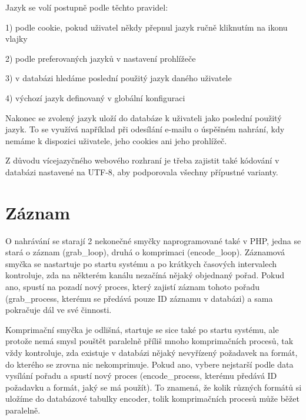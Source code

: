 \vspace{10pt}

Jazyk se volí postupně podle těchto pravidel: 

\vspace{10pt}

1) podle cookie, pokud uživatel někdy přepnul jazyk ručně kliknutím na ikonu vlajky

2) podle preferovaných jazyků v nastavení prohlížeče

3) v databázi hledáme poslední použitý jazyk daného uživatele

4) výchozí jazyk definovaný v globální konfiguraci

\vspace{10pt}

Nakonec se zvolený jazyk uloží do databáze k uživateli jako poslední použitý jazyk. To se využívá například při odesílání e-mailu o úspěšném nahrání, kdy nemáme k dispozici uživatele, jeho cookies ani jeho prohlížeč.

\vspace{10pt}

Z důvodu vícejazyčného webového rozhraní je třeba zajistit také kódování v databázi nastavené na UTF-8, aby podporovala všechny přípustné varianty.

\vspace{10pt}

\section{Záznam}

\vspace{10pt}

O nahrávání se starají 2 nekonečné smyčky naprogramované také v PHP, jedna se stará o záznam (grab\_loop), druhá o komprimaci (encode\_loop). Záznamová smyčka se nastartuje po startu systému a po krátkych časových intervalech kontroluje, zda na některém kanálu nezačíná nějaký objednaný pořad. 
Pokud ano, spustí na pozadí nový proces, který zajistí záznam tohoto pořadu (grab\_process, kterému se předává pouze ID záznamu v databázi) a sama pokračuje dál ve své činnosti.

Komprimační smyčka je odlišná, startuje se sice také po startu systému, ale protože nemá smysl pouštět paralelně příliš mnoho komprimačních procesů, tak vždy kontroluje, zda existuje v databázi nějaký nevyřízený požadavek na formát, do kterého se zrovna nic nekomprimuje. Pokud ano, vybere nejstarší podle data vysílání pořadu a spustí nový proces (encode\_process, kterému předává ID požadavku a formát, jaký se má použít). To znamená, že kolik různých formátů si uložíme do databázové tabulky encoder, tolik komprimačních procesů může běžet paralelně.

